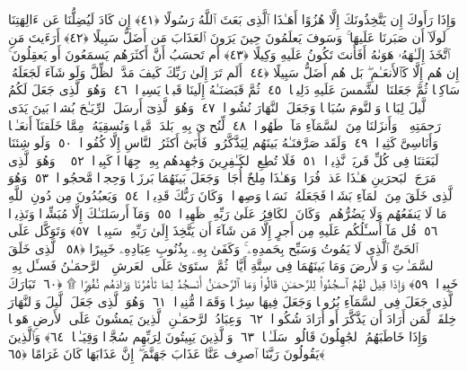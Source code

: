  وَإِذَا رَأَوكَ إِن يَتَّخِذُونَكَ إِلَّا هُزُوًا أَهَـٰذَا ٱلَّذِى بَعَثَ ٱللَّهُ رَسُولًا ﴿٤١﴾
 إِن كَادَ لَيُضِلُّنَا عَن ءَالِهَتِنَا لَولَآ أَن صَبَرنَا عَلَيهَا ۚ وَسَوفَ يَعلَمُونَ حِينَ يَرَونَ ٱلعَذَابَ مَن أَضَلُّ سَبِيلًا ﴿٤٢﴾
 أَرَءَيتَ مَنِ ٱتَّخَذَ إِلَـٰهَهُۥ هَوَىٰهُ أَفَأَنتَ تَكُونُ عَلَيهِ وَكِيلًا ﴿٤٣﴾
 أَم تَحسَبُ أَنَّ أَكثَرَهُم يَسمَعُونَ أَو يَعقِلُونَ ۚ إِن هُم إِلَّا كَٱلأَنعَـٰمِ ۖ بَل هُم أَضَلُّ سَبِيلًا ﴿٤٤﴾
 أَلَم تَرَ إِلَىٰ رَبِّكَ كَيفَ مَدَّ ٱلظِّلَّ وَلَو شَآءَ لَجَعَلَهُۥ سَاكِنًۭا ثُمَّ جَعَلنَا ٱلشَّمسَ عَلَيهِ دَلِيلًۭا ﴿٤٥﴾
 ثُمَّ قَبَضنَـٰهُ إِلَينَا قَبضًۭا يَسِيرًۭا ﴿٤٦﴾
 وَهُوَ ٱلَّذِى جَعَلَ لَكُمُ ٱلَّيلَ لِبَاسًۭا وَٱلنَّومَ سُبَاتًۭا وَجَعَلَ ٱلنَّهَارَ نُشُورًۭا ﴿٤٧﴾
 وَهُوَ ٱلَّذِىٓ أَرسَلَ ٱلرِّيَـٰحَ بُشرًۢا بَينَ يَدَى رَحمَتِهِۦ ۚ وَأَنزَلنَا مِنَ ٱلسَّمَآءِ مَآءًۭ طَهُورًۭا ﴿٤٨﴾
 لِّنُحۦِىَ بِهِۦ بَلدَةًۭ مَّيتًۭا وَنُسقِيَهُۥ مِمَّا خَلَقنَآ أَنعَـٰمًۭا وَأَنَاسِىَّ كَثِيرًۭا ﴿٤٩﴾
 وَلَقَد صَرَّفنَـٰهُ بَينَهُم لِيَذَّكَّرُوا۟ فَأَبَىٰٓ أَكثَرُ ٱلنَّاسِ إِلَّا كُفُورًۭا ﴿٥٠﴾
 وَلَو شِئنَا لَبَعَثنَا فِى كُلِّ قَريَةٍۢ نَّذِيرًۭا ﴿٥١﴾
 فَلَا تُطِعِ ٱلكَـٰفِرِينَ وَجَٰهِدهُم بِهِۦ جِهَادًۭا كَبِيرًۭا ﴿٥٢﴾
 ۞ وَهُوَ ٱلَّذِى مَرَجَ ٱلبَحرَينِ هَـٰذَا عَذبٌۭ فُرَاتٌۭ وَهَـٰذَا مِلحٌ أُجَاجٌۭ وَجَعَلَ بَينَهُمَا بَرزَخًۭا وَحِجرًۭا مَّحجُورًۭا ﴿٥٣﴾
 وَهُوَ ٱلَّذِى خَلَقَ مِنَ ٱلمَآءِ بَشَرًۭا فَجَعَلَهُۥ نَسَبًۭا وَصِهرًۭا ۗ وَكَانَ رَبُّكَ قَدِيرًۭا ﴿٥٤﴾
 وَيَعبُدُونَ مِن دُونِ ٱللَّهِ مَا لَا يَنفَعُهُم وَلَا يَضُرُّهُم ۗ وَكَانَ ٱلكَافِرُ عَلَىٰ رَبِّهِۦ ظَهِيرًۭا ﴿٥٥﴾
 وَمَآ أَرسَلنَـٰكَ إِلَّا مُبَشِّرًۭا وَنَذِيرًۭا ﴿٥٦﴾
 قُل مَآ أَسـَٔلُكُم عَلَيهِ مِن أَجرٍ إِلَّا مَن شَآءَ أَن يَتَّخِذَ إِلَىٰ رَبِّهِۦ سَبِيلًۭا ﴿٥٧﴾
 وَتَوَكَّل عَلَى ٱلحَىِّ ٱلَّذِى لَا يَمُوتُ وَسَبِّح بِحَمدِهِۦ ۚ وَكَفَىٰ بِهِۦ بِذُنُوبِ عِبَادِهِۦ خَبِيرًا ﴿٥٨﴾
 ٱلَّذِى خَلَقَ ٱلسَّمَـٰوَٟتِ وَٱلأَرضَ وَمَا بَينَهُمَا فِى سِتَّةِ أَيَّامٍۢ ثُمَّ ٱستَوَىٰ عَلَى ٱلعَرشِ ۚ ٱلرَّحمَـٰنُ فَسـَٔل بِهِۦ خَبِيرًۭا ﴿٥٩﴾
 وَإِذَا قِيلَ لَهُمُ ٱسجُدُوا۟ لِلرَّحمَـٰنِ قَالُوا۟ وَمَا ٱلرَّحمَـٰنُ أَنَسجُدُ لِمَا تَأمُرُنَا وَزَادَهُم نُفُورًۭا ۩ ﴿٦٠﴾
 تَبَارَكَ ٱلَّذِى جَعَلَ فِى ٱلسَّمَآءِ بُرُوجًۭا وَجَعَلَ فِيهَا سِرَٰجًۭا وَقَمَرًۭا مُّنِيرًۭا ﴿٦١﴾
 وَهُوَ ٱلَّذِى جَعَلَ ٱلَّيلَ وَٱلنَّهَارَ خِلفَةًۭ لِّمَن أَرَادَ أَن يَذَّكَّرَ أَو أَرَادَ شُكُورًۭا ﴿٦٢﴾
 وَعِبَادُ ٱلرَّحمَـٰنِ ٱلَّذِينَ يَمشُونَ عَلَى ٱلأَرضِ هَونًۭا وَإِذَا خَاطَبَهُمُ ٱلجَٰهِلُونَ قَالُوا۟ سَلَـٰمًۭا ﴿٦٣﴾
 وَٱلَّذِينَ يَبِيتُونَ لِرَبِّهِم سُجَّدًۭا وَقِيَـٰمًۭا ﴿٦٤﴾
 وَٱلَّذِينَ يَقُولُونَ رَبَّنَا ٱصرِف عَنَّا عَذَابَ جَهَنَّمَ ۖ إِنَّ عَذَابَهَا كَانَ غَرَامًا ﴿٦٥﴾
